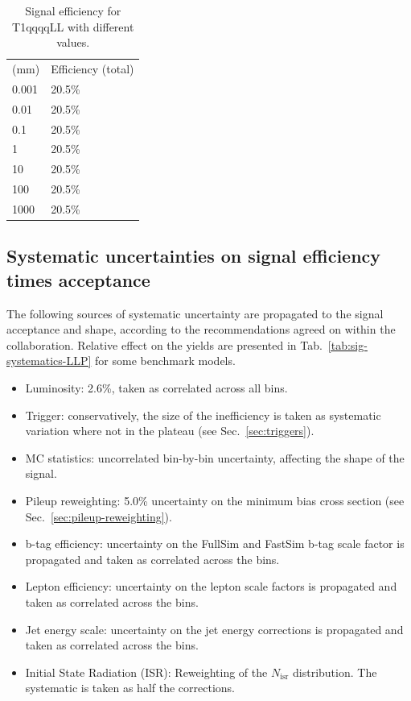 \begin{table}[h!]
    \scriptsize
	\caption{Signal efficiency for T1qqqqLL with different \ctau values.}
    \label{tab:sig-eff-LLP}
    \centering
    \begin{tabular}{ ll }
        \hline \hline
	    \ctau (mm) & Efficiency (total) \\ 
            0.001 & 20.5\% \\
            0.01  & 20.5\% \\
            0.1   & 20.5\% \\
            1     & 20.5\% \\
            10    & 20.5\% \\
            100   & 20.5\% \\
            1000  & 20.5\% \\
        \hline \hline
    \end{tabular}
\end{table}


\clearpage
\subsection{Systematic uncertainties on signal efficiency times acceptance}
\label{sec:sig-syst-LLP}

The following sources of systematic uncertainty are propagated to the signal
acceptance and shape, according to the recommendations agreed on within the
collaboration. Relative effect on the yields are presented in
Tab.~\ref{tab:sig-systematics-LLP} for some benchmark models.

\begin{itemize}
    \item Luminosity: 2.6\%, taken as correlated across all bins.
    \item Trigger: conservatively, the size of the inefficiency is taken as
        systematic variation where not in the plateau (see Sec.~\ref{sec:triggers}).
    \item MC statistics:  uncorrelated bin-by-bin uncertainty, affecting the
        shape of the signal.
    \item Pileup reweighting: 5.0\% uncertainty on the minimum bias cross section
        (see Sec.~\ref{sec:pileup-reweighting}).
    \item b-tag efficiency: uncertainty on the FullSim and FastSim b-tag scale
        factor is propagated and taken as correlated across the bins.
    \item Lepton efficiency: uncertainty on the lepton scale factors is
        propagated and taken as correlated across the bins.
    \item Jet energy scale: uncertainty on the jet energy corrections is
        propagated and taken as correlated across the bins.
    \item Initial State Radiation (ISR): Reweighting of the $N_{\text{isr}}$
        distribution. The systematic is taken as half the corrections.
\end{itemize}

